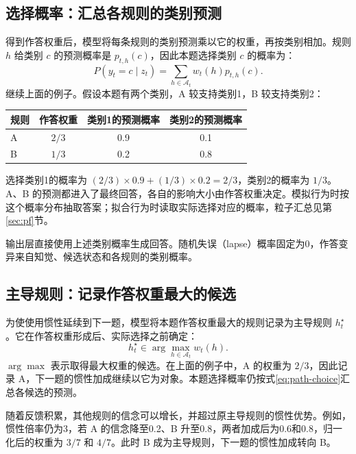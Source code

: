 \documentclass[12pt]{article}
\begin{document}
\subsection{选择概率：汇总各规则的类别预测}

得到作答权重后，模型将每条规则的类别预测乘以它的权重，再按类别相加。规则 $h$ 给类别 $c$ 的预测概率是 $p_{t,h}(c)$，因此本题选择类别 $c$ 的概率为：
\begin{equation}
P(y_t=c\mid z_t)=\sum_{h\in \mathcal A_t}w_t(h)p_{t,h}(c).
\label{eq:path-choice}
\end{equation}
继续上面的例子。假设本题有两个类别，A 较支持类别1，B 较支持类别2：

\begin{center}
\begin{tabular}{lccc}
\toprule
规则 & 作答权重 & 类别1的预测概率 & 类别2的预测概率\\
\midrule
A & $2/3$ & 0.9 & 0.1\\
B & $1/3$ & 0.2 & 0.8\\
\bottomrule
\end{tabular}
\end{center}

选择类别1的概率为 $(2/3)\times0.9+(1/3)\times0.2=2/3$，类别2的概率为 $1/3$。A、B 的预测都进入了最终回答，各自的影响大小由作答权重决定。模拟行为时按这个概率分布抽取答案；拟合行为时读取实际选择对应的概率，粒子汇总见第\ref{sec:pf}节。

输出层直接使用上述类别概率生成回答。随机失误（lapse）概率固定为0，作答变异来自知觉、候选状态和各规则的类别概率。

\subsection{主导规则：记录作答权重最大的候选}

为使使用惯性延续到下一题，模型将本题作答权重最大的规则记录为主导规则 $h_t^{\star}$。它在作答权重形成后、实际选择之前确定：
\begin{equation}
h_t^{\star}\in\arg\max_{h\in \mathcal A_t}w_t(h).
\label{eq:dominant-rule}
\end{equation}
$\arg\max$ 表示取得最大权重的候选。在上面的例子中，A 的权重为 $2/3$，因此记录 A，下一题的惯性加成继续以它为对象。本题选择概率仍按式\eqref{eq:path-choice}汇总各候选的预测。

随着反馈积累，其他规则的信念可以增长，并超过原主导规则的惯性优势。例如，惯性倍率仍为3，若 A 的信念降至0.2、B 升至0.8，两者加成后为0.6和0.8，归一化后的权重为 $3/7$ 和 $4/7$。此时 B 成为主导规则，下一题的惯性加成转向 B。
\end{document}
